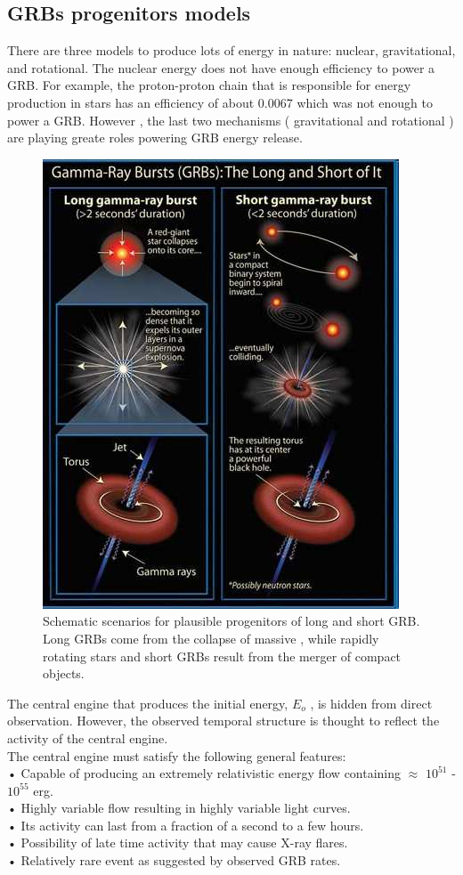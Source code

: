 \subsection{ GRBs progenitors models }
There are three  models  to produce lots of energy in nature: nuclear, gravitational, and rotational. The nuclear energy does not have enough efficiency to power a GRB. For  example, the proton-proton  chain  that is responsible for energy production in stars  has  an  efficiency  of  about  0.0067 which was not enough to power a GRB. However , the last two mechanisms ( gravitational and rotational ) are playing   greate roles powering  GRB energy release.
\begin{figure}[h]
\begin{center}
\includegraphics[scale=0.6]{Figures/prog of GRBs.png}
\caption{Schematic scenarios for plausible progenitors of long and short GRB.  Long GRBs come from the collapse of massive , while  rapidly rotating stars and short GRBs result from the merger of compact objects.\citep{23}}
\end{center}
\end{figure}
The central engine that produces the initial energy, $ E_{o} $ , is hidden from direct observation. However, the observed temporal structure is thought to reflect the  activity  of  the central engine.\citep{23}\\The central engine must satisfy the following general features:\\
• Capable of producing an extremely relativistic energy flow containing $\approx$ $ 10^{51} $ - $ 10^{55} $ erg.\\
• Highly variable flow resulting in highly variable light curves.\\
• Its  activity can last from a fraction of a second to a few hours.\\
• Possibility of late time activity that may cause X-ray flares.\\
• Relatively rare event as suggested by observed GRB rates.\\
